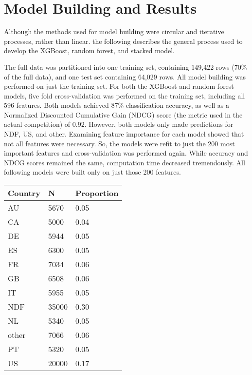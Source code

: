\documentclass{article}
\begin{document}
\section{Model Building and Results}

Although the methods used for model building were circular and iterative processes, rather than linear. the following describes the general process used to develop the XGBoost, random forest, and stacked model. 


The full data was partitioned into one training set, containing 149,422 rows (70\% of the full data), and one 
test set containing 64,029 rows. All model building was performed on just the training set. For both the XGBoost 
and random forest models, five fold cross-validation was performed on the training set, including all 596 features. 
Both models achieved 87\% classification accuracy, as well as a Normalized Discounted Cumulative Gain (NDCG) score 
(the metric used in the actual competition) of 0.92. However, both models only made predictions for NDF, US, and 
other. Examining feature importance for each model showed that not all features were necessary. So, the models were 
refit to just the 200 most important features and cross-validation was performed again. While accuracy and NDCG
scores remained the same, computation time decreased tremendously. All following models were built only on just those 
200 features. 

\begin{table}[ht]
\centering
\begin{tabular}{| l | l | l |}
  \hline
  \textbf{Country} & \textbf{N} & \textbf{Proportion} \\ 
  \hline
  AU & 5670 & 0.05 \\ 
  CA & 5000 & 0.04 \\ 
  DE & 5944 & 0.05 \\ 
  ES & 6300 & 0.05 \\ 
  FR & 7034 & 0.06 \\ 
  GB & 6508 & 0.06 \\ 
  IT & 5955 & 0.05 \\ 
  NDF & 35000 & 0.30 \\ 
  NL & 5340 & 0.05 \\ 
  other & 7066 & 0.06 \\ 
  PT & 5320 & 0.05 \\ 
  US & 20000 & 0.17 \\ 
   \hline
\end{tabular}
\label{table:smote}
\end{table}
\end{document}
